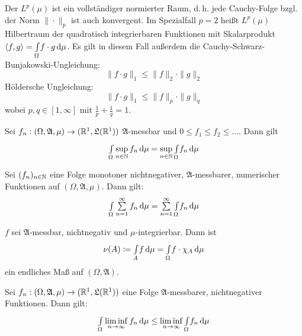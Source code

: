 \documentclass{cheat-sheet}
\newcommand{\Alg}{\mathfrak{A}}
\newcommand{\LebAlg}{\mathfrak{L}} %
\newcommand{\IntOmu}[1]{\Int{\Omega}{}{#1}{\mu}} %
\begin{document}

\begin{bem}
  Der $L^p(\mu)$ ist ein vollständiger normierter Raum, d.\,h. jede Cauchy-Folge bzgl. der Norm $\| \cdot \|_p$ ist auch konvergent. Im Spezialfall $p = 2$ heißt $L^p(\mu)$ Hilbertraum der quadratisch integrierbaren Funktionen mit Skalarprodukt $\langle f , g \rangle = \IntOmu{f \cdot g}$. Es gilt in diesem Fall außerdem die Cauchy-Schwarz-Bunjakowski-Ungleichung:
  \[ \| f \cdot g \|_{1} \leq \|f\|_2 \cdot \|g\|_2 \]
  Höldersche Ungleichung:
  \[ \| f \cdot g \|_{1} \leq \|f\|_p \cdot \|g\|_q \]
  wobei $p, q \in [1, \infty]$ mit $\tfrac{1}{p} + \tfrac{1}{q} = 1$.
\end{bem}



\begin{satz}
  Sei $f_n : (\Omega, \Alg, \mu) \to (\R^1, \LebAlg(\R^1))$ $\Alg$-messbar und $0 \leq f_1 \leq f_2 \leq ...$. Dann gilt
  \[ \IntOmu{\sup_{n \in \N} f_n} = \sup_{n \in \N} \IntOmu{f_n} \]
\end{satz}

\begin{satz}
  Sei $(f_n)_{n \in \mathbb{N}}$ eine Folge monotoner nichtnegativer, $\Alg$-messbarer, numerischer Funktionen auf $(\Omega, \Alg, \mu)$. Dann gilt:
  \[ \IntOmu{\sum_{n=1}^{\infty} f_n} = \sum_{n=1}^\infty \IntOmu{f_n} \]
\end{satz}

\begin{satz}
  $f$ sei $\Alg$-messbar, nichtnegativ und $\mu$-integrierbar. Dann ist
  \[ \nu(A) \coloneqq \Int{A}{}{f}{\mu} = \IntOmu{f \cdot \chi_A} \]
  ein endliches Maß auf $(\Omega, \Alg)$.
\end{satz}

\begin{satz}
  Sei $f_n : (\Omega, \Alg, \mu) \to (\R^1, \LebAlg(\R^1))$ eine Folge $\Alg$-messbarer, nichtnegativer Funktionen. Dann gilt:
  \[ \IntOmu{\liminf_{n \to \infty} f_n} \leq \liminf_{n \to \infty} \IntOmu{f_n} \]
\end{satz}
\end{document}
